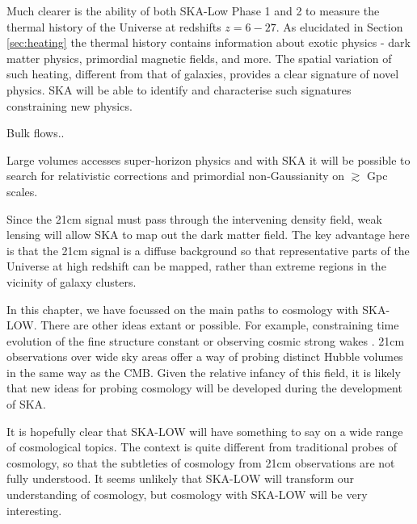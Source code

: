 \documentclass{PoS}
\begin{document}
Much clearer is the ability of both SKA-Low Phase 1 and 2 to measure the thermal history of the Universe at redshifts $z=6-27$. As elucidated in Section \ref{sec:heating} the thermal history contains information about exotic physics - dark matter physics, primordial magnetic fields, and more. The spatial variation of such heating, different from that of galaxies, provides a clear signature of novel physics. SKA will be able to identify and characterise such signatures constraining new physics. 

Bulk flows..

Large volumes accesses super-horizon physics and with SKA it will be possible to search for relativistic corrections and primordial non-Gaussianity on $\gtrsim$ Gpc scales.

Since the 21cm signal must pass through the intervening density field, weak lensing will allow SKA to map out the dark matter field. The key advantage here is that the 21cm signal is a diffuse background so that representative parts of the Universe at high redshift can be mapped, rather than extreme regions in the vicinity of galaxy clusters. 

In this chapter, we have focussed on the main paths to cosmology with SKA-LOW. There are other ideas extant or possible. For example, constraining time evolution of the fine structure constant \citep{2007PhRvL..98k1301K} or observing cosmic strong wakes \citep{2010JCAP...12..028B}. 21cm observations over wide sky areas offer a way of probing distinct Hubble volumes in the same way as the CMB. Given the relative infancy of this field, it is likely that new ideas for probing cosmology will be developed during the development of SKA.

It is hopefully clear that SKA-LOW will have something to say on a wide range of cosmological topics. The context is quite different from traditional probes of cosmology, so that the subtleties of cosmology from 21cm observations are not fully understood. It seems unlikely that SKA-LOW will transform our understanding of cosmology, but cosmology with SKA-LOW will be very interesting.





\end{document}
